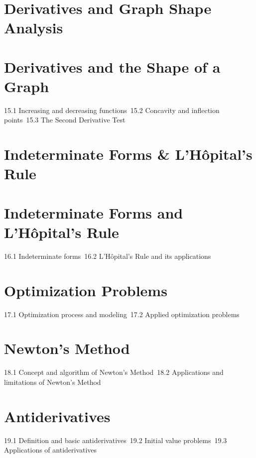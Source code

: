 \section{Derivatives and Graph Shape Analysis}
\section{Derivatives and the Shape of a Graph}
15.1 Increasing and decreasing functions\
15.2 Concavity and inflection points\
15.3 The Second Derivative Test\
\section{Indeterminate Forms \& L'Hôpital's Rule}
\section{Indeterminate Forms and L'Hôpital's Rule}
16.1 Indeterminate forms\
16.2 L'Hôpital's Rule and its applications\
\section{Optimization Problems}
17.1 Optimization process and modeling\
17.2 Applied optimization problems\
\section{Newton's Method}
18.1 Concept and algorithm of Newton's Method\
18.2 Applications and limitations of Newton's Method\
\section{Antiderivatives}
19.1 Definition and basic antiderivatives\
19.2 Initial value problems\
19.3 Applications of antiderivatives\
